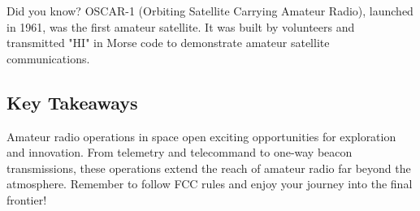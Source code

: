 \begin{tcolorbox}[title=Fun Fact: The First Amateur Satellite]
Did you know? OSCAR-1 (Orbiting Satellite Carrying Amateur Radio), launched in 1961, was the first amateur satellite. It was built by volunteers and transmitted "HI" in Morse code to demonstrate amateur satellite communications.
\end{tcolorbox}

\subsection*{Key Takeaways}
Amateur radio operations in space open exciting opportunities for exploration and innovation. From telemetry and telecommand to one-way beacon transmissions, these operations extend the reach of amateur radio far beyond the atmosphere. Remember to follow FCC rules and enjoy your journey into the final frontier!


